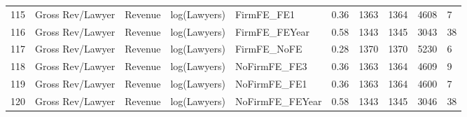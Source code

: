 \documentclass{article}
\begin{document}
\begin{table}[H]
\begin{tabular}{rlllllllll}
  115 & Gross Rev/Lawyer & Revenue & log(Lawyers) & FirmFE\_FE1 & 0.36 & 1363 & 1364 & 4608 & 7 \\ 
  116 & Gross Rev/Lawyer & Revenue & log(Lawyers) & FirmFE\_FEYear & 0.58 & 1343 & 1345 & 3043 & 38 \\ 
  117 & Gross Rev/Lawyer & Revenue & log(Lawyers) & FirmFE\_NoFE & 0.28 & 1370 & 1370 & 5230 & 6 \\ 
  118 & Gross Rev/Lawyer & Revenue & log(Lawyers) & NoFirmFE\_FE3 & 0.36 & 1363 & 1364 & 4609 & 9 \\ 
  119 & Gross Rev/Lawyer & Revenue & log(Lawyers) & NoFirmFE\_FE1 & 0.36 & 1363 & 1364 & 4600 & 7 \\ 
  120 & Gross Rev/Lawyer & Revenue & log(Lawyers) & NoFirmFE\_FEYear & 0.58 & 1343 & 1345 & 3046 & 38 \\ 
   \hline
\end{tabular}
\end{table}
\end{document}
